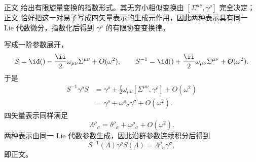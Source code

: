 \begin{derivation}

正文 给出有限旋量变换的指数形式。其无穷小相似变换由 $[\Sigma^{\mu\nu},\gamma^\rho]$ 完全决定；正文 恰好把这一对易子写成四矢量表示的生成元作用，因此两种表示具有同一 Lie 代数微分，指数化后得到 $\gamma^\rho$ 的有限协变变换律。

写成一阶参数展开，
\begin{equation*}
 S=\id()-\frac{\ii}{2}\omega_{\mu\nu}\Sigma^{\mu\nu}+O(\omega^2),
 \qquad
 S^{-1}=\id()+\frac{\ii}{2}\omega_{\mu\nu}\Sigma^{\mu\nu}+O(\omega^2).
\end{equation*}
于是
\begin{align*}
 S^{-1}\gamma^\rho S
 &=\gamma^\rho+\frac{\ii}{2}\omega_{\mu\nu}
 [\Sigma^{\mu\nu},\gamma^\rho]+O(\omega^2)\\
 &=\gamma^\rho+\omega^\rho{}_{\sigma}\gamma^\sigma+O(\omega^2).
\end{align*}
四矢量表示同样满足
\begin{equation*}
 \Lambda^\rho{}_{\sigma}
 =\delta^\rho{}_{\sigma}+\omega^\rho{}_{\sigma}+O(\omega^2).
\end{equation*}
两种表示由同一 Lie 代数参数生成，因此沿群参数连续积分后得到
\begin{equation*}
 S^{-1}(\Lambda)\gamma^\rho S(\Lambda)
 =\Lambda^\rho{}_{\sigma}\gamma^\sigma,
\end{equation*}
即正文。
\end{derivation}

